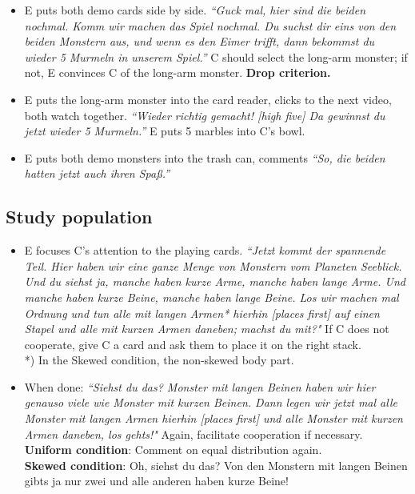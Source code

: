 \documentclass{article}
\begin{document}
\begin{itemize}
\item
  E puts both demo cards side by side. \emph{``Guck mal, hier sind die beiden nochmal. Komm wir machen das Spiel nochmal. Du suchst dir eins von den beiden Monstern aus, und wenn es den Eimer trifft, dann bekommst du wieder 5 Murmeln in unserem Spiel.''} C should select the long-arm monster; if not, E convinces C of the long-arm monster. \textbf{Drop criterion.}
\item
  E puts the long-arm monster into the card reader, clicks to the next video, both watch together. \emph{``Wieder richtig gemacht! {[}high five{]} Da gewinnst du jetzt wieder 5 Murmeln.''} E puts 5 marbles into C's bowl.
\item
  E puts both demo monsters into the trash can, comments \emph{``So, die beiden hatten jetzt auch ihren Spaß.''}
\end{itemize}

\subsection{Study population}

\begin{itemize}
\item
  E focuses C's attention to the playing cards.
  \emph{``Jetzt kommt der spannende Teil.
  Hier haben wir eine ganze Menge von Monstern vom Planeten Seeblick.
  Und du siehst ja, manche haben kurze Arme, manche haben lange Arme.
  Und manche haben kurze Beine, manche haben lange Beine.
  Los wir machen mal Ordnung und tun alle mit langen Armen* hierhin [places first] auf einen Stapel und alle mit kurzen Armen daneben; machst du mit?"}
  If C does not cooperate, give C a card and ask them to place it on the right stack. \\
  {*}) In the Skewed condition, the non-skewed body part.
\item
  When done: \emph{``Siehst du das? Monster mit langen Beinen haben wir hier genauso viele wie Monster mit kurzen Beinen.
  Dann legen wir jetzt mal alle Monster mit langen Armen hierhin [places first] und alle Monster mit kurzen Armen daneben, los gehts!"}
  Again, facilitate cooperation if necessary. \\
  \textbf{Uniform condition}: Comment on equal distribution again. \\
  \textbf{Skewed condition}: Oh, siehst du das? Von den Monstern mit langen Beinen gibts ja nur zwei und alle anderen haben kurze Beine!
\end{itemize}
\end{document}
